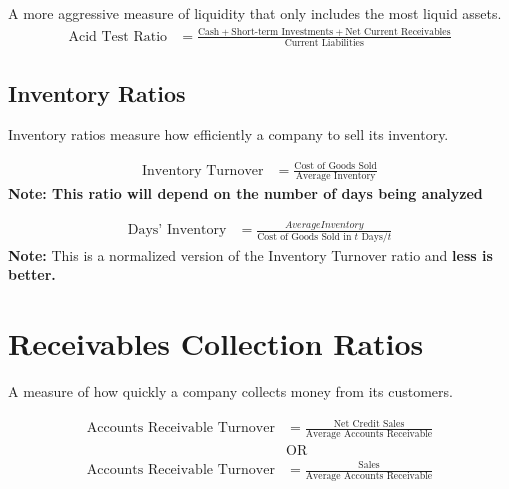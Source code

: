 \begin{theorem}
    A more aggressive measure of liquidity that only includes the most liquid assets.
    \begin{align}
        \text{Acid Test Ratio} & = \frac{\text{Cash} + \text{Short-term Investments} + \text{Net Current Receivables}}{\text{Current Liabilities}}
    \end{align}
\end{theorem}

\subsection{Inventory Ratios}

\begin{definition}
    Inventory ratios measure how efficiently a company to sell its inventory.
\end{definition}

\begin{theorem}
    \begin{align}
        \text{Inventory Turnover} & = \frac{\text{Cost of Goods Sold}}{\text{Average Inventory}}
    \end{align}
    \textbf{Note: This ratio will depend on the number of days being analyzed}
\end{theorem}

\begin{theorem}
    \begin{align}
        \text{Days' Inventory} & = \frac{Average Inventory}{\text{Cost of Goods Sold in } t\text{ Days} / t}
    \end{align}
    \textbf{Note:} This is a normalized version of the Inventory Turnover ratio and \textbf{less is better.}
\end{theorem}
\section{Receivables Collection Ratios}
\begin{definition}
    A measure of how quickly a company collects money from its customers.
\end{definition}

\begin{theorem}
    \begin{align}
        \text{Accounts Receivable Turnover} & = \frac{\text{Net Credit Sales}}{\text{Average Accounts Receivable}} \\
                                            & \text{OR}                                                            \\
        \text{Accounts Receivable Turnover} & = \frac{\text{Sales}}{\text{Average Accounts Receivable}}
    \end{align}
\end{theorem}

